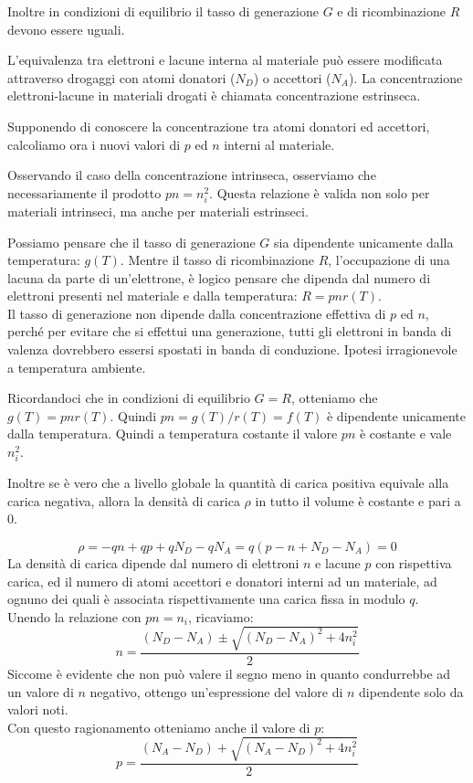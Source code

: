 \documentclass[../template]{subfiles}
\begin{document}
Inoltre in condizioni di equilibrio il tasso di generazione $G$ e di ricombinazione $R$ devono essere uguali.

L'equivalenza tra elettroni e lacune interna al materiale può essere modificata attraverso drogaggi con atomi donatori ($N_D$) o accettori ($N_A$). La concentrazione elettroni-lacune in materiali drogati è chiamata concentrazione estrinseca.

Supponendo di conoscere la concentrazione tra atomi donatori ed accettori, calcoliamo ora i nuovi valori di $p$ ed $n$ interni al materiale.

Osservando il caso della concentrazione intrinseca, osserviamo che necessariamente il prodotto $pn = n_i^2$. Questa relazione è valida non solo per materiali intrinseci, ma anche per materiali estrinseci.

Possiamo pensare che il tasso di generazione $G$ sia dipendente unicamente dalla temperatura: $g(T)$. Mentre il tasso di ricombinazione $R$, l'occupazione di una lacuna da parte di un'elettrone, è logico pensare che dipenda dal numero di elettroni presenti nel materiale e dalla temperatura: $R = pnr(T)$.
\\
Il tasso di generazione non dipende dalla concentrazione effettiva di $p$ ed $n$, perché per evitare che si effettui una generazione, tutti gli elettroni in banda di valenza dovrebbero essersi spostati in banda di conduzione. Ipotesi irragionevole a temperatura ambiente.

Ricordandoci che in condizioni di equilibrio $G = R$, otteniamo che $g(T) = pnr(T)$. Quindi $pn = g(T)/r(T) = f(T)$ è dipendente unicamente dalla temperatura. Quindi a temperatura costante il valore $pn$ è costante e vale $n_i^2$.

Inoltre se è vero che a livello globale la quantità di carica positiva equivale alla carica negativa, allora la densità di carica $\rho$ in tutto il volume è costante e pari a $0$.

\[
    \rho = -q n + qp  + qN_D -q N_A = q (p -n + N_D - N_A) = 0
\]
La densità di carica dipende dal numero di elettroni $n$ e lacune $p$ con rispettiva carica, ed il numero di atomi accettori e donatori interni ad un materiale, ad ognuno dei quali è associata rispettivamente una carica fissa in modulo $q$.
\\
Unendo la relazione con $pn = n_i$, ricaviamo:
\[
    n = \frac{(N_D - N_A) \pm \sqrt{(N_D - N_A)^2 + 4 n_i^2}}{2}
\]
Siccome è evidente che non può valere il segno meno in quanto condurrebbe ad un valore di $n$ negativo, ottengo un'espressione del valore di $n$ dipendente solo da valori noti.
\\
Con questo ragionamento otteniamo anche il valore di $p$:
\[
    p = \frac{(N_A - N_D) + \sqrt{(N_A - N_D)^2 + 4 n_i^2}}{2}
\]
\end{document}
